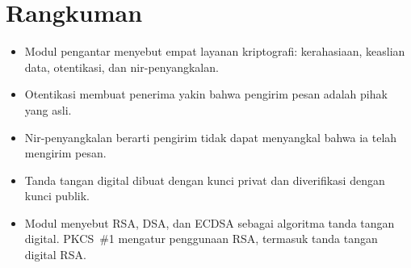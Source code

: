 \section{Rangkuman}
\begin{itemize}
    \item Modul pengantar menyebut empat layanan kriptografi: kerahasiaan,
          keaslian data, otentikasi, dan nir-penyangkalan.
    \item Otentikasi membuat penerima yakin bahwa pengirim pesan adalah pihak
          yang asli.
    \item Nir-penyangkalan berarti pengirim tidak dapat menyangkal bahwa ia
          telah mengirim pesan.
    \item Tanda tangan digital dibuat dengan kunci privat dan diverifikasi
          dengan kunci publik.
    \item Modul menyebut RSA, DSA, dan ECDSA sebagai algoritma tanda tangan
          digital. PKCS~\#1 mengatur penggunaan RSA, termasuk tanda tangan
          digital RSA.
\end{itemize}
